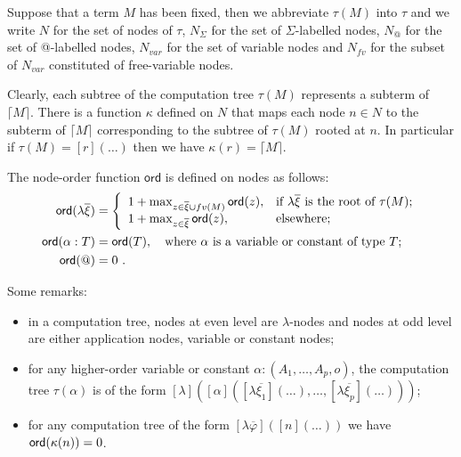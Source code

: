 \documentclass{llncs}
\newcommand\aux[1]{\lceil #1\rceil}
\newcommand\ord[1]{{\sf ord}(#1)}
\newcommand\union{\cup}
\begin{document}
Suppose that a term $M$ has been fixed, then we abbreviate $\tau(M)$ into $\tau$  and we write
$N$ for the set of nodes of $\tau$, $N_\Sigma$ for the set of $\Sigma$-labelled nodes,
$N_@$ for the set of @-labelled nodes, $N_{var}$ for the set of variable nodes and
$N_{fv}$ for the subset of $N_{var}$ constituted of free-variable nodes.


Clearly, each subtree of the computation tree $\tau(M)$ represents a subterm of $\aux{M}$.
There is a function $\kappa$ defined on $N$ that maps each node $n \in N$ to the subterm of $\aux{M}$ corresponding to the subtree of $\tau(M)$ rooted at $n$.
In particular if $\tau(M) = [r](\ldots)$ then we have $\kappa(r) = \aux{M}$.

\begin{definition}
\label{def:nodeorder}
The node-order function $\textsf{ord}$ is defined on nodes as follows:
\begin{align*}
    \ord{\lambda \overline{\xi}} &=
\left\{
  \begin{array}{ll}
    1 +  \max_{z\in \overline{\xi}\union fv(M)} \ord{z}, & \hbox{if $\lambda \overline{\xi}$ is the root of $\tau(M)$;} \\
    1 + \max_{z\in \overline{\xi}} \ord{z}, & \hbox{elsewhere;}
  \end{array}
\right. \\
    \ord{\alpha:T} &= \ord{T}, \quad \hbox{where $\alpha$ is a variable or constant of type $T$;} \\
    \ord{@} &= 0 \ .
\end{align*}
\end{definition}

\noindent Some remarks:
\begin{itemize}
\item in a computation tree, nodes at even level are $\lambda$-nodes and nodes at odd level are either application nodes,
variable or constant nodes;
\item for any higher-order variable or constant $\alpha : (A_1,\ldots,A_p,o)$, the computation tree $\tau(\alpha)$ is of the form
$ [\lambda](
        [\alpha]([\lambda \overline{\xi_1}](\ldots), \ldots, [\lambda \overline{\xi_p}](\ldots))
        )
$;

\item for any computation tree of the form $[\lambda \overline{\varphi}]([n]( \ldots ))$ we have $\ord{\kappa(n)}=0$.
\end{itemize}
\end{document}
